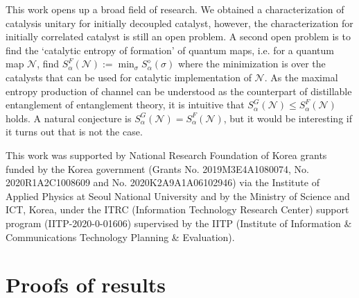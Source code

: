 \documentclass[aps, reprint, amsmath,amssymb, prx, superscriptaddress]{revtex4-2}
\begin{document}
This work opens up a broad field of research. We obtained a characterization of catalysis unitary for initially decoupled catalyst, however, the characterization for initially correlated catalyst is still an open problem. A second open problem is to find the `catalytic entropy of formation' of quantum maps, i.e. for a quantum map $\mathcal{N}$, find $S_{\alpha}^F(\mathcal{N}):=\min_{\sigma}{S_\alpha^\diamond(\sigma)}$ where the minimization is over the catalysts that can be used for catalytic implementation of $\mathcal{N}$. As the maximal entropy production of channel can be understood as the counterpart of distillable entanglement of entanglement theory, it is intuitive that $S_\alpha^G(\mathcal{N})\leq S_{\alpha}^F(\mathcal{N})$ holds. A natural conjecture is $S_\alpha^G(\mathcal{N})=S_{\alpha}^F(\mathcal{N})$, but it would be interesting if it turns out that is not the case. 

\begin{acknowledgements}
This work was supported by National Research Foundation of Korea grants funded by the Korea government (Grants No. 2019M3E4A1080074, No. 2020R1A2C1008609 and No. 2020K2A9A1A06102946) via the Institute of Applied Physics at Seoul National University and by the Ministry of Science and ICT, Korea, under the ITRC (Information Technology Research Center) support program (IITP-2020-0-01606) supervised by the IITP (Institute of Information \& Communications Technology Planning \& Evaluation).
\end{acknowledgements}

\appendix
\section{Proofs of results} \label{appendix}
\printProofs


\end{document}
